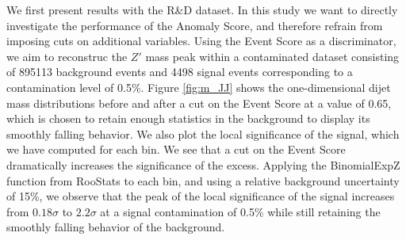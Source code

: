 \documentclass[letterpaper,11pt]{article}
\begin{document}

We first present results with the R\&D dataset. In this study we want to directly investigate the performance of the Anomaly Score, and therefore refrain from imposing cuts on additional variables. Using the Event Score as a discriminator, we aim to reconstruc the $Z'$ mass peak within a contaminated dataset consisting of 895113 background events and 4498 signal events corresponding to a contamination level of 0.5\%. Figure \ref{fig:m_JJ} shows the one-dimensional dijet mass distributions before and after a cut on the Event Score at a value of 0.65, which is chosen to retain enough statistics in the background to display its smoothly falling behavior. We also plot the local significance of the signal, which we have computed for each bin. We see that a cut on the Event Score dramatically increases the significance of the excess. Applying the BinomialExpZ function from RooStats to each bin, and using a relative background uncertainty of 15\%, we observe that the peak of the local significance of the signal increases from $0.18\sigma$ to $2.2\sigma$ at a signal contamination of 0.5\% while still retaining the smoothly falling behavior of the background.
\end{document}
